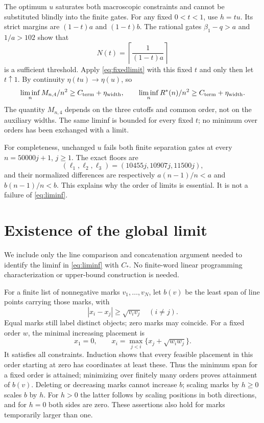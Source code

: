 \documentclass[review,supplement,hidelinks,onefignum,onetabnum]{siamart251216}
\newcommand{\Rstar}{R^*}
\newcommand{\Cterm}{C_{\rm term}}
\newcommand{\etaw}{\eta_{\rm width}}
\begin{document}
The optimum $u$ saturates both macroscopic constraints and cannot be
substituted blindly into the finite gates. For any fixed $0<t<1$, use
$h=tu$. Its strict margins are $(1-t)a$ and $(1-t)b$. The rational
gates $\beta_1-q>a$ and $1/a>102$ show that
\[
N(t)=\left\lceil\frac1{(1-t)a}\right\rceil
\]
is a sufficient threshold. Apply \eqref{eq:fixedlimit} with this fixed
$t$ and only then let $t\uparrow1$. By continuity $\eta(tu)\to\eta(u)$,
so
\begin{equation}\label{eq:liminf}
\liminf_n M_{n,4}/n^2\ge\Cterm+\etaw,\qquad
\liminf_n\Rstar(n)/n^2\ge\Cterm+\etaw.
\end{equation}
The quantity $M_{n,4}$ depends on the three cutoffs and common order,
not on the auxiliary widths. The same liminf is bounded for every
fixed $t$; no minimum over orders has been exchanged with a limit.

For completeness, unchanged $u$ fails both finite separation gates at
every $n=50000j+1$, $j\ge1$. The exact floors are
\[
(\ell_1,\ell_2,\ell_3)=(10455j,10907j,11500j),
\]
and their normalized differences are respectively $a(n-1)/n<a$ and
$b(n-1)/n<b$. This explains why the order of limits is essential.
It is not a failure of \eqref{eq:liminf}.

\section{Existence of the global limit}\label{sec:existence}
We include only the line comparison and concatenation argument needed
to identify the liminf in \eqref{eq:liminf} with $C_*$. No finite-word
linear programming characterization or upper-bound construction is needed.

For a finite list of nonnegative marks $v_1,\ldots,v_N$, let $b(v)$ be
the least span of line points carrying those marks, with
\begin{equation}\label{eq:line}
|x_i-x_j|\ge\sqrt{v_iv_j}\quad(i\ne j).
\end{equation}
Equal marks still label distinct objects; zero marks may coincide.
For a fixed order $w$, the minimal increasing placement is
\[
x_1=0,\qquad x_i=\max_{j<i}\{x_j+\sqrt{w_iw_j}\}.
\]
It satisfies all constraints. Induction shows that every feasible
placement in this order starting at zero has coordinates at least these.
Thus the minimum span for a fixed order is attained; minimizing over
finitely many orders proves attainment of $b(v)$. Deleting or decreasing
marks cannot increase $b$; scaling marks by $h\ge0$ scales $b$ by $h$.
For $h>0$ the latter follows by scaling positions in both directions,
and for $h=0$ both sides are zero. These assertions also hold for marks
temporarily larger than one.
\end{document}

